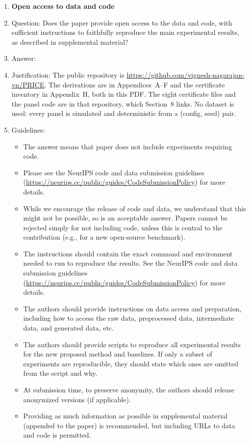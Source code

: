 \begin{enumerate}
\item {\bf Open access to data and code}
    \item[] Question: Does the paper provide open access to the data and code, with sufficient instructions to faithfully reproduce the main experimental results, as described in supplemental material?
    \item[] Answer: \answerYes{}
    \item[] Justification: The public repository is \url{https://github.com/vignesh-nagarajan-vn/PRICE}. The derivations are in Appendices~A--F and the certificate inventory in Appendix~H, both in this PDF. The eight certificate files and the panel code are in that repository, which Section~8 links. No dataset is used: every panel is simulated and deterministic from a (config, seed) pair.
    \item[] Guidelines:
    \begin{itemize}
        \item The answer \answerNA{} means that paper does not include experiments requiring code.
        \item Please see the NeurIPS code and data submission guidelines (\url{https://neurips.cc/public/guides/CodeSubmissionPolicy}) for more details.
        \item While we encourage the release of code and data, we understand that this might not be possible, so \answerNo{} is an acceptable answer. Papers cannot be rejected simply for not including code, unless this is central to the contribution (e.g., for a new open-source benchmark).
        \item The instructions should contain the exact command and environment needed to run to reproduce the results. See the NeurIPS code and data submission guidelines (\url{https://neurips.cc/public/guides/CodeSubmissionPolicy}) for more details.
        \item The authors should provide instructions on data access and preparation, including how to access the raw data, preprocessed data, intermediate data, and generated data, etc.
        \item The authors should provide scripts to reproduce all experimental results for the new proposed method and baselines. If only a subset of experiments are reproducible, they should state which ones are omitted from the script and why.
        \item At submission time, to preserve anonymity, the authors should release anonymized versions (if applicable).
        \item Providing as much information as possible in supplemental material (appended to the paper) is recommended, but including URLs to data and code is permitted.
    \end{itemize}



\end{enumerate}
